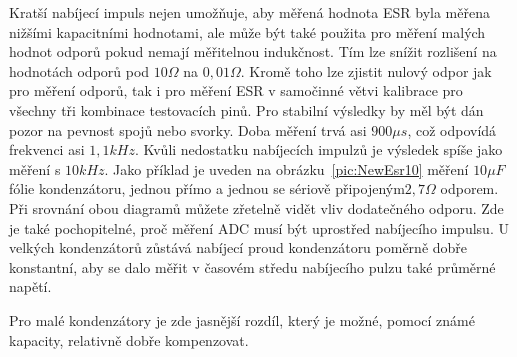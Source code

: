 Kratší nabíjecí impuls nejen umožňuje, aby měřená hodnota ESR byla měřena nižšími kapacitními hodnotami,
ale může být také použita pro měření malých hodnot odporů pokud nemají měřitelnou indukčnost.
Tím  lze snížit rozlišení na hodnotách odporů pod \(10\Omega\) na \(0,01\Omega\).
Kromě toho lze zjistit nulový odpor jak pro měření odporů, tak i pro měření ESR v samočinné
větvi kalibrace pro všechny tři kombinace testovacích pinů.
Pro stabilní výsledky by měl být dán pozor na pevnost spojů nebo svorky.
Doba měření trvá asi \(900\mu s\), což odpovídá frekvenci asi \(1,1kHz\).
Kvůli nedostatku nabíjecích impulzů je výsledek spíše jako měření s \(10kHz\).
Jako příklad je uveden na obrázku~\ref{pic:NewEsr10} měření \(10\mu F\) fólie kondenzátoru, jednou přímo a jednou se sériově připojeným\(2,7\Omega\) odporem.
Při srovnání obou diagramů můžete zřetelně vidět vliv dodatečného odporu.
Zde je také pochopitelné, proč měření ADC musí být uprostřed nabíjecího impulsu.
U velkých kondenzátorů zůstává nabíjecí proud kondenzátoru poměrně dobře konstantní,
aby se dalo měřit v časovém středu nabíjecího pulzu také průměrné napětí.

Pro malé kondenzátory je zde jasnější rozdíl, který je možné, pomocí známé kapacity, relativně dobře kompenzovat.

